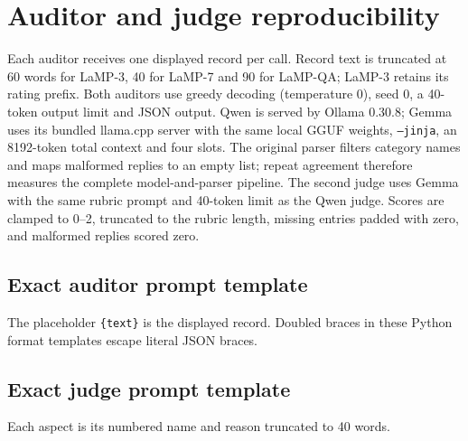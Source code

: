 \documentclass[10pt]{article}
\begin{document}
\section{Auditor and judge reproducibility}
Each auditor receives one displayed record per call. Record text is truncated
at 60 words for LaMP-3, 40 for LaMP-7 and 90 for LaMP-QA; LaMP-3 retains its
rating prefix. Both auditors use greedy decoding (temperature 0), seed 0,
a 40-token output limit and JSON output. Qwen is served by Ollama 0.30.8;
Gemma uses its bundled llama.cpp server with the same local GGUF weights,
\texttt{--jinja}, an 8192-token total context and four slots. The original
parser filters category names and maps malformed replies to an empty list;
repeat agreement therefore measures the complete model-and-parser pipeline.
The second judge uses Gemma with the same rubric prompt and 40-token limit
as the Qwen judge. Scores are clamped to 0--2, truncated to the rubric length,
missing entries padded with zero, and malformed replies scored zero.


\subsection*{Exact auditor prompt template}
The placeholder \texttt{\{text\}} is the displayed record. Doubled braces
in these Python format templates escape literal JSON braces.

\subsection*{Exact judge prompt template}
Each aspect is its numbered name and reason truncated to 40 words.

\end{document}
